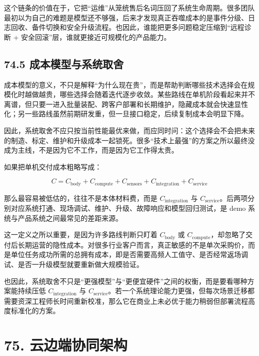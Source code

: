 这个链条的价值在于，它把“运维”从笼统售后名词压回了系统生命周期。很多团队最初以为自己的难题是模型还不够强，后来才发现真正吞噬成本的是事件分级、日志回收、备件切换和安全升级流程。也因此，谁能把更多问题稳定压缩到“远程诊断 + 安全回滚”层，谁就更接近可规模化的产品能力。

\subsection*{74.5 成本模型与系统取舍}


成本模型的意义，不只是解释“为什么现在贵”，而是帮助判断哪些技术选择会在规模化时越做越贵，哪些选择会随着迭代逐步收敛。某些路线在单机阶段看起来并不离谱，但只要一进入批量装配、跨客户部署和长期维护，隐藏成本就会快速显性化；另一些路线虽然前期研发重，但一旦接口稳定，后续复制成本会明显下降。

因此，系统取舍不应只按当前性能最优来做，而应同时问：这个选择会不会把未来的制造、标定、维护和升级成本一起锁死。很多“技术上最强”的方案之所以最终没成为主线，不是因为它不工作，而是因为它工作得太贵。

如果把单机交付成本粗略写成：

\begingroup
\scriptsize
\begin{equation*}
C = C_{\text{body}} + C_{\text{compute}} + C_{\text{sensors}} + C_{\text{integration}} + C_{\text{service}}
\end{equation*}
\endgroup

那么最容易被低估的，往往不是本体材料费，而是 \(C_{\text{integration}}\) 与 \(C_{\text{service}}\)。后两项分别对应系统打通、现场调试、维护、升级、故障响应和模型回归测试，是 demo 系统与产品系统之间最常见的差距来源。

这一定义之所以重要，是因为许多路线判断只盯着 \(C_{\text{body}}\) 或 \(C_{\text{compute}}\)，却忽略了交付后长期运营的隐性成本。对很多行业客户而言，真正敏感的不是单次采购价，而是单位任务成功所需的总拥有成本，即是否需要高频人工值守、是否经常返场调试、是否一升级模型就要重新做大规模验证。

也因此，系统取舍不只是“更强模型”与“更便宜硬件”之间的权衡，而是要看哪种方案能持续压低 \(C_{\text{integration}}\) 与 \(C_{\text{service}}\)。若一个系统理论能力更强，但每次场景迁移都需要资深工程师长时间重新校准，那么它在商业上未必优于能力稍弱但部署流程高度标准化的方案。

\section*{75. 云边端协同架构}

